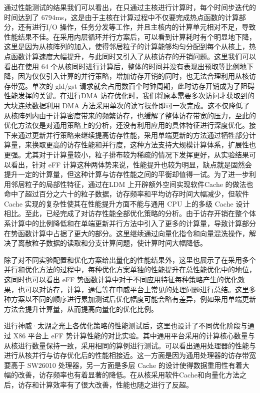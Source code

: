 通过性能测试的结果我们可以看出，在只通过主核进行计算时，每个时间步迭代的时间达到了 6794ms，这是由于主核在计算过程中不仅要完成热点函数的计算部分，还有进行I/O 操作，任务分发等工作，并且主核内的计算单元相对不足，导致性能结果不佳。在采用内层循环并行方案后，可以看到计算耗时有个明显地下降，这里是因为从核阵列的加入，使得邻居粒子的计算能够均匀分配到每个从核上，热点函数计算速度大幅提升，与此同时又引入了从核访存的开销问题。这里我们可以看出在使用 64 个从核同时进行计算后，整体的时间并没有表现出预取等比例地下降，因为仅仅引入计算的并行策略，增加访存开销的同时，也无法合理利用从核访存带宽。单次的 gld/gst 请求就会占用数百个时钟周期，此时访存开销成为了阻碍性能发挥的关键。在进行DMA 访存优化时，我们将原本需要多次访问才获取到的大块连续数据利用 DMA 方法采用单次的读写操作即可一次完成。这不仅降低了从核阵列内由于计算密度带来的频繁访存，也缓解了整体访存带宽的压力，至此的优化方法仅是对通用策略上的分析，还没有利用应用的具体特征进行深度优化。接下来通过更新并行策略来继续提高访存性能，采用单端更新的方法通过牺牲部分计算量，来换取更高的访存性能和并行度，这种方法支持大规模计算体系，扩展性也更强。尤其对于计算量较小，粒子排布较为稀疏的情况下发挥更好，从实验结果可以看出，针对 eFF 计算这种两体势来说，性能提升也较为明显，缺点就是固然会提升一定的计算量，但这种计算与访存性能之间的平衡却值得一试。为了进一步利用邻居粒子的局部性特征，通过在LDM 上开辟额外空间实现软件Cache 的做法也命中了超过百分之六十的粒子数据，访存频率和平均访存时间大幅减少，但软件Cache 实现的复杂性使其在性能提升方面不能与通用 CPU 上的多级 Cache 设计相比。至此，已经完成了对访存性能全部优化策略的分析。由于访存开销在整个体系计算中的比例降低和在单端更新并行方法中引入了更多的计算量，导致计算部分在势函数计算中占据了更大的部分。这里继续通过向量化指令和向量混洗操作，解决了离散粒子数据的读取和分支计算问题，使计算时间大幅降低。

除了对不同实验配置和优化方案给出量化的性能结果外，这里也展示了在采用多个并行和优化方法的过程中，每种优化方案单独的性能提升在总性能优化中的地位，这同时也可以看出 eFF 势函数计算中对于不同应用特征每种策略产生的优化效果，也可以对访存，计算，通信等在申威平台上常见的处理问题进行总结。这里多种方案以不同的顺序进行累加测试后优化幅度可能会略有差异，例如采用单端更新方法会提升计算量，从而提高向量化的优化比例。

进行神威·太湖之光上各优化策略的性能测试后，这里也设计了不同优化阶段与通过 X86 平台上 eFF 势计算性能的对比实验。其中通用平台采用的计算核心数量与从核进行数量保持一致，采用相同的算例进行测试。可以看出通用处理器的性能与进行从核并行与访存优化后的性能相接近。这一方面是因为通用处理器的访存带宽要高于 SW26010 处理器，另一方面是多层 Cache 的设计使得数据重用性有着大幅的改善，访存频率也有着显著的降低。在从核采用软件Cache和向量化方法之后，访存和计算效率有了很大改善，性能也随之进行了反超。

